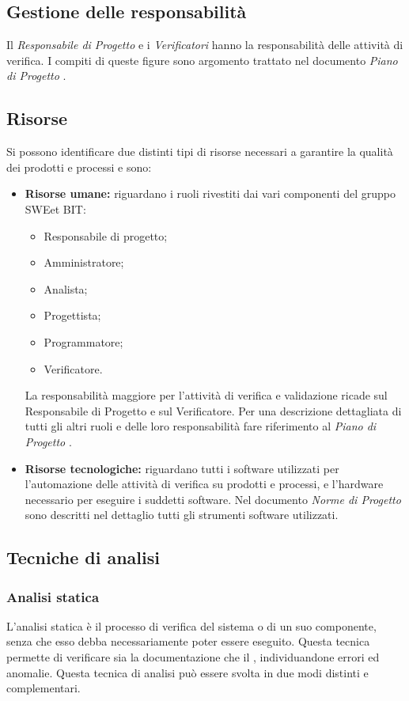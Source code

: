   \subsection{Gestione delle responsabilità}
    Il \emph{Responsabile di Progetto} e i \emph{Verificatori} hanno la responsabilità delle attività di verifica.
    I compiti di queste figure sono argomento trattato nel documento \emph{Piano di Progetto \VersionePP{}}.

  \subsection{Risorse}
    Si possono identificare due distinti tipi di risorse necessari a garantire la qualità dei prodotti e processi e sono:
    \begin{itemize}
      \item \textbf{Risorse umane:} riguardano i ruoli rivestiti dai vari componenti del gruppo SWEet BIT:
      \begin{itemize}
        \item Responsabile di progetto;
        \item Amministratore;
        \item Analista;
        \item Progettista;
        \item Programmatore;
        \item Verificatore.
      \end{itemize}

		La responsabilità maggiore per l’attività di verifica e validazione ricade sul Responsabile di Progetto e sul Verificatore. Per una descrizione dettagliata di tutti gli altri ruoli e delle loro responsabilità fare riferimento al \emph{Piano di Progetto \VersionePP{}}.

      \item \textbf{Risorse tecnologiche:} riguardano tutti i software utilizzati per l'automazione delle attività di verifica su prodotti e processi, e l'hardware necessario per eseguire i suddetti software. Nel documento \emph{Norme di Progetto \VersioneNP{}} sono descritti nel dettaglio tutti gli strumenti software utilizzati.
    \end{itemize}

\subsection{Tecniche di analisi}
\subsubsection{Analisi statica}
    L'analisi statica è il processo di verifica del sistema o di un suo componente, senza che esso debba necessariamente poter essere eseguito.
    Questa tecnica permette di verificare sia la documentazione che il , individuandone errori ed anomalie. Questa tecnica di analisi può essere svolta in due modi distinti e complementari.

